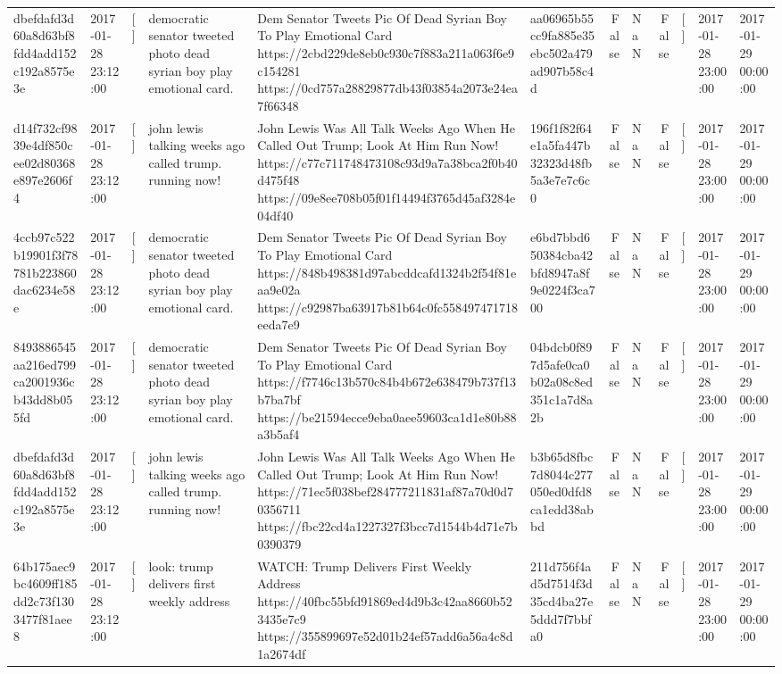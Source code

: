 \begin{tabular}{llllllrlrlll}
dbefdafd3d60a8d63bf8fdd4add152c192a8575e3e & 2017-01-28 23:12:00 & [] & democratic senator tweeted photo dead syrian boy play emotional card. & Dem Senator Tweets Pic Of Dead Syrian Boy To Play Emotional Card https://2cbd229de8eb0c930c7f883a211a063f6e9c154281 https://0cd757a28829877db43f03854a2073e24ea7f66348 & aa06965b55cc9fa885e35ebc502a479ad907b58c4d & False & NaN & False & [] & 2017-01-28 23:00:00 & 2017-01-29 00:00:00 \\
d14f732cf9839e4df850cee02d80368e897e2606f4 & 2017-01-28 23:12:00 & [] & john lewis talking weeks ago called trump. running now! & John Lewis Was All Talk Weeks Ago When He Called Out Trump; Look At Him Run Now! https://c77c711748473108c93d9a7a38bca2f0b40d475f48 https://09e8ee708b05f01f14494f3765d45af3284e04df40 & 196f1f82f64e1a5fa447b32323d48fb5a3e7e7c6c0 & False & NaN & False & [] & 2017-01-28 23:00:00 & 2017-01-29 00:00:00 \\
4ccb97c522b19901f3f78781b223860dac6234e58e & 2017-01-28 23:12:00 & [] & democratic senator tweeted photo dead syrian boy play emotional card. & Dem Senator Tweets Pic Of Dead Syrian Boy To Play Emotional Card https://848b498381d97abcddcafd1324b2f54f81eaa9e02a https://c92987ba63917b81b64c0fc558497471718eeda7e9 & e6bd7bbd650384cba42bfd8947a8f9e0224f3ca700 & False & NaN & False & [] & 2017-01-28 23:00:00 & 2017-01-29 00:00:00 \\
8493886545aa216ed799ca2001936cb43dd8b055fd & 2017-01-28 23:12:00 & [] & democratic senator tweeted photo dead syrian boy play emotional card. & Dem Senator Tweets Pic Of Dead Syrian Boy To Play Emotional Card https://f7746c13b570c84b4b672e638479b737f13b7ba7bf https://be21594ecce9eba0aee59603ca1d1e80b88a3b5af4 & 04bdcb0f897d5afe0ca0b02a08c8ed351c1a7d8a2b & False & NaN & False & [] & 2017-01-28 23:00:00 & 2017-01-29 00:00:00 \\
dbefdafd3d60a8d63bf8fdd4add152c192a8575e3e & 2017-01-28 23:12:00 & [] & john lewis talking weeks ago called trump. running now! & John Lewis Was All Talk Weeks Ago When He Called Out Trump; Look At Him Run Now! https://71ec5f038bef284777211831af87a70d0d70356711 https://fbc22cd4a1227327f3bcc7d1544b4d71e7b0390379 & b3b65d8fbc7d8044c277050ed0dfd8ca1edd38abbd & False & NaN & False & [] & 2017-01-28 23:00:00 & 2017-01-29 00:00:00 \\
64b175aec9bc4609ff185dd2c73f1303477f81aee8 & 2017-01-28 23:12:00 & [] & look: trump delivers first weekly address & WATCH: Trump Delivers First Weekly Address https://40fbc55bfd91869ed4d9b3c42aa8660b523435e7c9 https://355899697e52d01b24ef57add6a56a4c8d1a2674df & 211d756f4ad5d7514f3d35cd4ba27e5ddd7f7bbfa0 & False & NaN & False & [] & 2017-01-28 23:00:00 & 2017-01-29 00:00:00 \\

\end{tabular}
